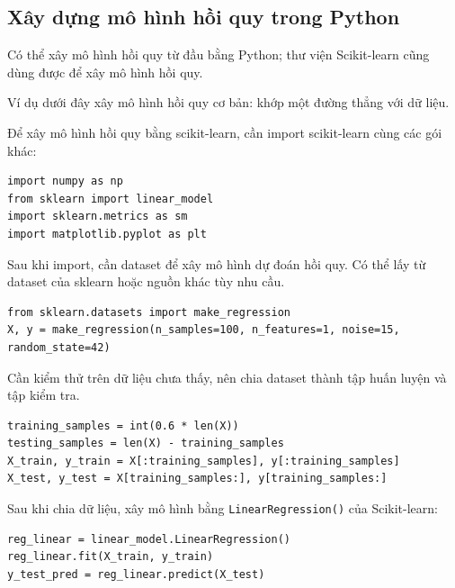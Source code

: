 \subsection{Xây dựng mô hình hồi quy trong Python}

\begin{phuongphap}[title={Cách xây dựng mô hình hồi quy}]
Có thể xây mô hình hồi quy từ đầu bằng Python; thư viện Scikit-learn cũng dùng được để xây mô hình hồi quy.

Ví dụ dưới đây xây mô hình hồi quy cơ bản: khớp một đường thẳng với dữ liệu.
\end{phuongphap}

\begin{vidu}[title={Bước 1: Import các gói Python}]
Để xây mô hình hồi quy bằng scikit-learn, cần import scikit-learn cùng các gói khác:

\begin{lstlisting}
import numpy as np
from sklearn import linear_model
import sklearn.metrics as sm
import matplotlib.pyplot as plt
\end{lstlisting}
\end{vidu}

\begin{vidu}[title={Bước 2: Nạp dataset}]
Sau khi import, cần dataset để xây mô hình dự đoán hồi quy. Có thể lấy từ dataset của sklearn hoặc nguồn khác tùy nhu cầu.

\begin{lstlisting}
from sklearn.datasets import make_regression
X, y = make_regression(n_samples=100, n_features=1, noise=15, random_state=42)
\end{lstlisting}
\end{vidu}

\begin{vidu}[title={Bước 3: Chia tập huấn luyện và kiểm tra}]
Cần kiểm thử trên dữ liệu chưa thấy, nên chia dataset thành tập huấn luyện và tập kiểm tra.

\begin{lstlisting}
training_samples = int(0.6 * len(X))
testing_samples = len(X) - training_samples
X_train, y_train = X[:training_samples], y[:training_samples]
X_test, y_test = X[training_samples:], y[training_samples:]
\end{lstlisting}
\end{vidu}

\begin{vidu}[title={Bước 4: Huấn luyện và dự đoán}]
Sau khi chia dữ liệu, xây mô hình bằng \texttt{LinearRegression()} của Scikit-learn:

\begin{lstlisting}
reg_linear = linear_model.LinearRegression()
reg_linear.fit(X_train, y_train)
y_test_pred = reg_linear.predict(X_test)
\end{lstlisting}
\end{vidu}

